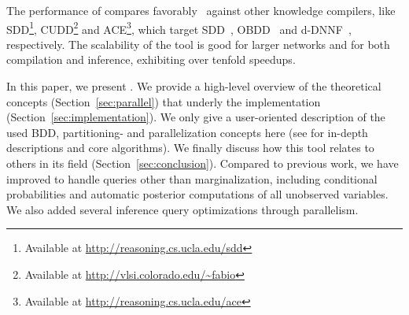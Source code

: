 The performance of \toolname compares favorably~\cite{dal2018parallel,dal2021compositional} against other knowledge compilers, like  SDD\footnote{Available at \url{http://reasoning.cs.ucla.edu/sdd}}, CUDD\footnote{Available at \url{http://vlsi.colorado.edu/~fabio}} and ACE\footnote{Available at \url{http://reasoning.cs.ucla.edu/ace}}, which target SDD~\cite{darwiche2011sdd}, OBDD~\cite{bryant1986graph} and d-DNNF~\cite{darwiche2002knowledge}, respectively. The scalability of the tool is good for larger networks and for both compilation and inference, exhibiting over tenfold speedups.

In this paper, we present \toolname. We provide a high-level overview of the theoretical concepts (Section~\ref{sec:parallel}) that underly the implementation (Section~\ref{sec:implementation}). We only give a user-oriented description of the used BDD, partitioning- and parallelization concepts here (see \cite{dal2018parallel,dal2021compositional} for in-depth descriptions and core algorithms). We finally discuss how this tool relates to others in its field (Section~\ref{sec:conclusion}). Compared to previous work, we have improved \toolname to handle queries other than marginalization, including conditional probabilities and automatic posterior computations of all unobserved variables. We also added several inference query optimizations through parallelism. 


